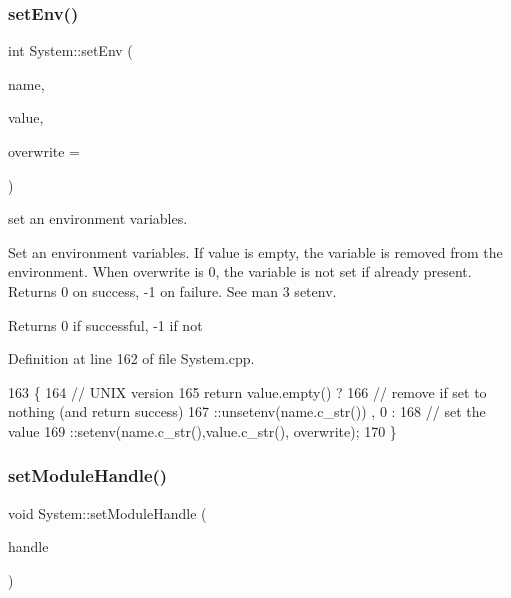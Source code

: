 \subsubsection{\texorpdfstring{set\+Env()}{setEnv()}}
{\footnotesize\ttfamily int System\+::set\+Env (\begin{DoxyParamCaption}\item[{const std\+::string \&}]{name,  }\item[{const std\+::string \&}]{value,  }\item[{int}]{overwrite = {} }\end{DoxyParamCaption})}



set an environment variables. 

Set an environment variables. If value is empty, the variable is removed from the environment. When overwrite is 0, the variable is not set if already present. Returns 0 on success, -\/1 on failure. See man 3 setenv.

\begin{DoxyReturn}{Returns}
0 if successful, -\/1 if not 
\end{DoxyReturn}


Definition at line 162 of file System.\+cpp.


\begin{DoxyCode}
163 \{
164   \textcolor{comment}{// UNIX version}
165   \textcolor{keywordflow}{return} value.empty() ?
166     \textcolor{comment}{// remove if set to nothing (and return success)}
167     ::unsetenv(name.c\_str()) , 0 :
168     \textcolor{comment}{// set the value}
169     ::setenv(name.c\_str(),value.c\_str(), overwrite);
170 \}
\end{DoxyCode}
\mbox{\label{namespaceSystem_af2318f71452b7e844f0b654a8bd93018}} 
\subsubsection{\texorpdfstring{set\+Module\+Handle()}{setModuleHandle()}}
{\footnotesize\ttfamily void System\+::set\+Module\+Handle (\begin{DoxyParamCaption}\item[{\hyperlink{namespaceSystem_a21dca3f6170a2b0a0ea3028040ba21b3}{System\+::\+Image\+Handle}}]{handle }\end{DoxyParamCaption})}



